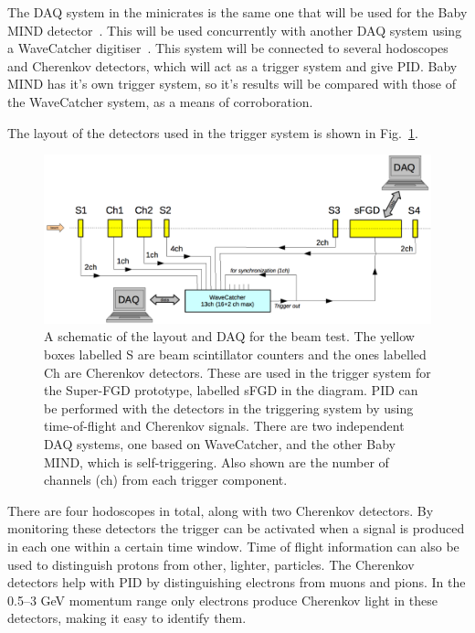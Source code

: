 \documentclass[aps,pra,12pt,notitlepage,tightenlines]{revtex4-1}
\begin{document}
The DAQ system in the minicrates is the same one that will be used for the Baby MIND detector~\cite{Antonova2017}. This will be used concurrently with another DAQ system using a WaveCatcher digitiser~\cite{CAEN}. This system will be connected to several hodoscopes and Cherenkov detectors, which will act as a trigger system and give PID. Baby MIND has it's own trigger system, so it's results will be compared with those of the WaveCatcher system, as a means of corroboration.

The layout of the detectors used in the trigger system is shown in Fig.\ \ref{fig:daq}.
\begin{figure}
 \includegraphics[scale=0.55]{daq}
 \caption{A schematic of the layout and DAQ for the beam test. The yellow boxes labelled S are beam scintillator counters and the ones labelled Ch are Cherenkov detectors. These are used in the trigger system for the Super-FGD prototype, labelled sFGD in the diagram. PID can be performed with the detectors in the triggering system by using time-of-flight and Cherenkov signals. There are two independent DAQ systems, one based on WaveCatcher, and the other Baby MIND, which is self-triggering. Also shown are the number of channels (ch) from each trigger component.}
 \label{fig:daq}
\end{figure}
There are four hodoscopes in total, along with two Cherenkov detectors. By monitoring these detectors the trigger can be activated when a signal is produced in each one within a certain time window. Time of flight information can also be used to distinguish protons from other, lighter, particles. The Cherenkov detectors help with PID by distinguishing electrons from muons and pions. In the 0.5--3 GeV momentum range only electrons produce Cherenkov light in these detectors, making it easy to identify them.
\end{document}
